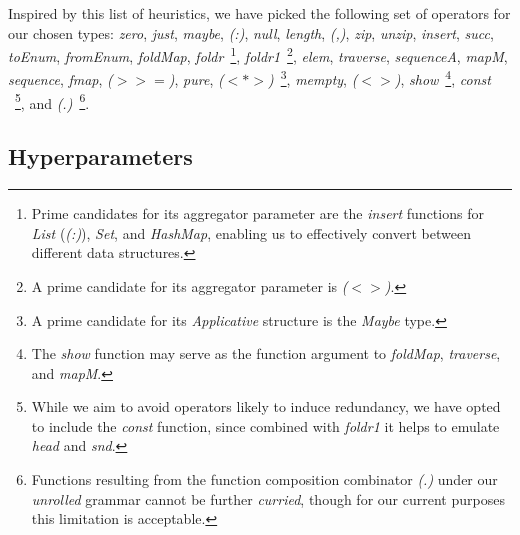 \documentclass{article}
\begin{document}
Inspired by this list of heuristics,
we have picked the following set of operators for our chosen types:
\emph{zero}, %
\emph{just}, %
\emph{maybe}, %
\emph{(:)}, %
\emph{null}, %
\emph{length}, %
\emph{(,)}, %
\emph{zip}, %
\emph{unzip}, %
\emph{insert}, %
\emph{succ}, %
\emph{toEnum}, %
\emph{fromEnum}, %
\emph{foldMap}, %
\emph{foldr}~\footnote{Prime candidates for its aggregator parameter are the \emph{insert} functions for \emph{List} (\emph{(:)}), \emph{Set}, and \emph{HashMap}, enabling us to effectively convert between different data structures.}, %
\emph{foldr1}~\footnote{A prime candidate for its aggregator parameter is \emph{($<>$)}.}, %
\emph{elem}, %
\emph{traverse}, %
\emph{sequenceA}, %
\emph{mapM}, %
\emph{sequence}, %
\emph{fmap}, %
\emph{($>>=$)}, %
\emph{pure}, %
\emph{($<*>$)}~\footnote{A prime candidate for its \emph{Applicative} structure is the \emph{Maybe} type.}, %
\emph{mempty}, %
\emph{($<>$)}, %
\emph{show}~\footnote{The \emph{show} function may serve as the function argument to \emph{foldMap}, \emph{traverse}, and \emph{mapM}.}, %
\emph{const}%
~\footnote{
    While we aim to avoid operators likely to induce redundancy,
    we have opted to include the \emph{const} function,
    since combined with \emph{foldr1} it helps to emulate \emph{head} and \emph{snd}.
},
and \emph{(.)}~\footnote{
    Functions resulting from the function composition combinator \emph{(.)} under our \emph{unrolled} grammar cannot be further \emph{curried}, though for our current purposes this limitation is acceptable.
}. %

\subsection{Hyperparameters} \label{sec:hpar}
\end{document}
